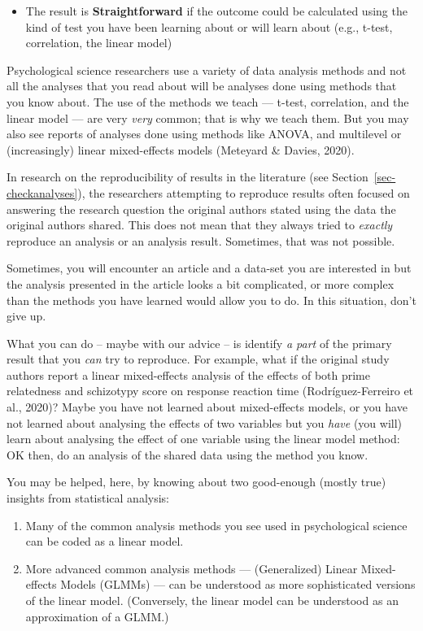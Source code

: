 \documentclass[
  letterpaper,
  DIV=11,
  numbers=noendperiod]{scrreprt}
\providecommand{\tightlist}{%
  \setlength{\itemsep}{0pt}\setlength{\parskip}{0pt}}\usepackage{longtable,booktabs,array}
\begin{document}
\begin{itemize}
\tightlist
\item
  The result is \textbf{Straightforward} if the outcome could be
  calculated using the kind of test you have been learning about or will
  learn about (e.g., t-test, correlation, the linear model)
\end{itemize}

Psychological science researchers use a variety of data analysis methods
and not all the analyses that you read about will be analyses done using
methods that you know about. The use of the methods we teach --- t-test,
correlation, and the linear model --- are very \emph{very} common; that
is why we teach them. But you may also see reports of analyses done
using methods like ANOVA, and multilevel or (increasingly) linear
mixed-effects models (Meteyard \& Davies, 2020).

In research on the reproducibility of results in the literature (see
Section~\ref{sec-checkanalyses}), the researchers attempting to
reproduce results often focused on answering the research question the
original authors stated using the data the original authors shared. This
does not mean that they always tried to \emph{exactly} reproduce an
analysis or an analysis result. Sometimes, that was not possible.

Sometimes, you will encounter an article and a data-set you are
interested in but the analysis presented in the article looks a bit
complicated, or more complex than the methods you have learned would
allow you to do. In this situation, don't give up.

What you can do -- maybe with our advice -- is identify \emph{a part} of
the primary result that you \emph{can} try to reproduce. For example,
what if the original study authors report a linear mixed-effects
analysis of the effects of both prime relatedness and schizotypy score
on response reaction time (Rodríguez-Ferreiro et al., 2020)? Maybe you
have not learned about mixed-effects models, or you have not learned
about analysing the effects of two variables but you \emph{have} (you
will) learn about analysing the effect of one variable using the linear
model method: OK then, do an analysis of the shared data using the
method you know.

You may be helped, here, by knowing about two good-enough (mostly true)
insights from statistical analysis:

\begin{enumerate}
\def\labelenumi{\arabic{enumi}.}
\tightlist
\item
  Many of the common analysis methods you see used in psychological
  science can be coded as a linear model.
\item
  More advanced common analysis methods --- (Generalized) Linear
  Mixed-effects Models (GLMMs) --- can be understood as more
  sophisticated versions of the linear model. (Conversely, the linear
  model can be understood as an approximation of a GLMM.)
\end{enumerate}
\end{document}
